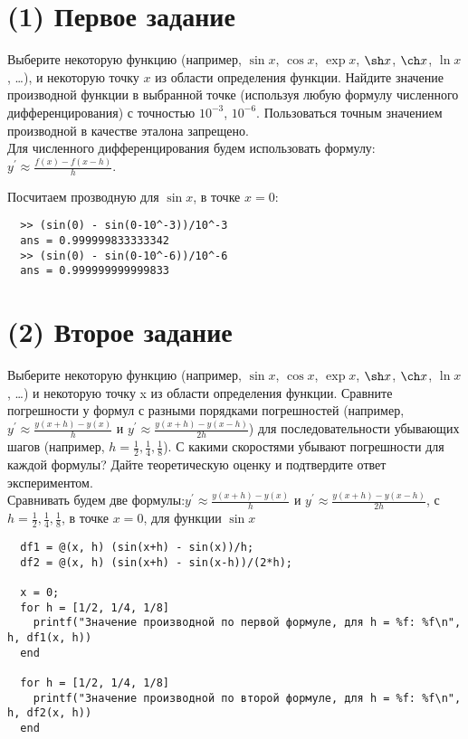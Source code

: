\maketitle
\tableofcontents
\newpage
\section{(1) Первое задание}
Выберите некоторую функцию (например, $\sin x$, $\cos x$, $\exp x$, $\sh x$, $\ch x$, $\ln x$, \ldots), и некоторую точку $x$ из области определения функции. Найдите значение производной функции в выбранной точке (используя любую формулу численного дифференцирования) с точностью $10^{-3}$, $10^{-6}$. Пользоваться точным значением производной в качестве эталона запрещено.\\[5mm]

Для численного дифференцирования будем использовать формулу: $y^{'} \approx \frac{f(x) - f(x-h)}{h}$.

Посчитаем прозводную для $\sin x$, в точке $x = 0$:
\begin{lstlisting}
  >> (sin(0) - sin(0-10^-3))/10^-3
  ans = 0.999999833333342
  >> (sin(0) - sin(0-10^-6))/10^-6
  ans = 0.999999999999833
\end{lstlisting}

\section{(2) Второе задание}
Выберите некоторую функцию (например, $\sin x$, $\cos x$, $\exp x$, $\sh x$, $\ch x$, $\ln x$, \ldots) и некоторую точку x из области определения функции. Сравните погрешности у формул с разными порядками погрешностей (например, $y^{'} \approx \frac{y(x+h) - y(x)}{h}$ и $y^{'} \approx \frac{y(x+h) - y(x-h)}{2h}$) для последовательности убывающих шагов (например, $h = \frac{1}{2}, \frac{1}{4}, \frac{1}{8}$). С какими скоростями убывают погрешности для каждой формулы? Дайте теоретическую оценку и подтвердите ответ экспериментом.\\[5mm]

Сравнивать будем две формулы:$y^{'} \approx \frac{y(x+h) - y(x)}{h}$ и $y^{'} \approx \frac{y(x+h) - y(x-h)}{2h}$, с $h = \frac{1}{2}, \frac{1}{4}, \frac{1}{8}$, в точке $x = 0$, для функции $\sin x$

\begin{lstlisting}
  df1 = @(x, h) (sin(x+h) - sin(x))/h;
  df2 = @(x, h) (sin(x+h) - sin(x-h))/(2*h);

  x = 0;
  for h = [1/2, 1/4, 1/8]
    printf("Значение производной по первой формуле, для h = %f: %f\n", h, df1(x, h))
  end

  for h = [1/2, 1/4, 1/8]
    printf("Значение производной по второй формуле, для h = %f: %f\n", h, df2(x, h))
  end
\end{lstlisting}

